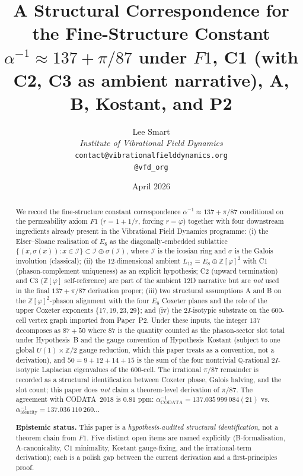 \documentclass[12pt]{article}
\title{A Structural Correspondence for the Fine-Structure Constant\\[6pt]
\large $\alpha^{-1} \approx 137 + \pi/87$ under $F1$, {C1} (with C2, C3 as ambient narrative), {A}, {B}, {Kostant}, and {P2}}
\author{%
  Lee Smart\\[4pt]
  \textit{Institute of Vibrational Field Dynamics}\\[2pt]
  \texttt{contact@vibrationalfielddynamics.org}\\[2pt]
  \texttt{@vfd\_org}%
}
\date{April 2026}
\theoremstyle{definition}
\theoremstyle{remark}
\newcommand{\Q}{\mathbb{Q}}
\newcommand{\Z}{\mathbb{Z}}
\newcommand{\Zphi}{\mathbb{Z}[\varphi]}
\begin{document}
\maketitle

\begin{abstract}
We record the fine-structure constant correspondence $\alpha^{-1} \approx 137 + \pi/87$ conditional on the permeability axiom $F1$ ($r = 1 + 1/r$, forcing $r = \varphi$) together with four downstream ingredients already present in the Vibrational Field Dynamics programme: (i) the Elser--Sloane realisation of $E_8$ as the diagonally-embedded sublattice $\{(x, \sigma(x)) : x \in \mathcal{I}\} \subset \mathcal{I} \oplus \sigma(\mathcal{I})$, where $\mathcal{I}$ is the icosian ring and $\sigma$ is the Galois involution (classical); (ii) the 12-dimensional ambient $L_{12} = E_8 \oplus \Zphi^2$ with C1 (phason-complement uniqueness) as an explicit hypothesis; C2 (upward termination) and C3 ($\Zphi$ self-reference) are part of the ambient 12D narrative but are \emph{not} used in the final $137 + \pi/87$ derivation proper; (iii) two structural assumptions A and B on the $\Zphi^2$-phason alignment with the four $E_8$ Coxeter planes and the role of the upper Coxeter exponents $\{17, 19, 23, 29\}$; and (iv) the $2I$-isotypic substrate on the 600-cell vertex graph imported from Paper~P2. Under these inputs, the integer $137$ decomposes as $87 + 50$ where $87$ is the quantity counted as the phason-sector slot total under Hypothesis~B and the gauge convention of Hypothesis~Kostant (subject to one global $U(1) \times \Z/2$ gauge reduction, which this paper treats as a convention, not a derivation), and $50 = 9 + 12 + 14 + 15$ is the sum of the four nontrivial $\Q$-rational $2I$-isotypic Laplacian eigenvalues of the 600-cell. The irrational $\pi/87$ remainder is recorded as a structural identification between Coxeter phase, Galois halving, and the slot count; this paper does \emph{not} claim a theorem-level derivation of $\pi/87$. The agreement with CODATA~2018 is $0.81$ ppm: $\alpha^{-1}_{\text{CODATA}} = 137.035\,999\,084(21)$ vs.\ $\alpha^{-1}_{\text{identity}} = 137.036\,110\,260\ldots$

\vspace{4pt}
\noindent\textbf{Epistemic status.} This paper is a \emph{hypothesis-audited structural identification}, not a theorem chain from $F1$. Five distinct open items are named explicitly (B-formalisation, A-canonicality, C1 minimality, Kostant gauge-fixing, and the irrational-term derivation); each is a polish gap between the current derivation and a first-principles proof.
\end{abstract}
\end{document}
